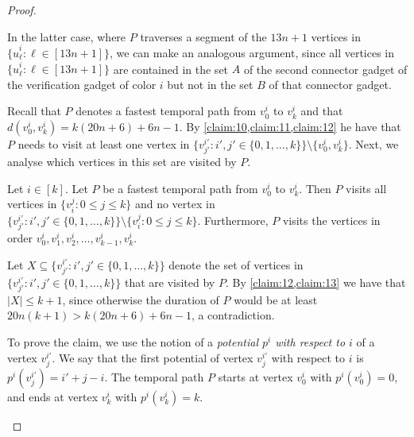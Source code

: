 \documentclass[a4paper,UKenglish,cleveref, autoref, thm-restate, anonymous]{lipics-v2021}
\begin{document}
\begin{proof}
\begin{claimproof}
    In the latter case, where $P$ traverses a segment of the $13n+1$ vertices in $\{\hat{u}^i_\ell :  \ell\in[13n+1]\}$, we can make an analogous argument, since all vertices in $\{\hat{u}^i_\ell :  \ell\in[13n+1]\}$ are contained in the set $A$ of the second connector gadget of the verification gadget of color $i$ but not in the set $B$ of that connector gadget.
\end{claimproof}

Recall that $P$ denotes a fastest temporal path from $v_0^i$ to $v_k^i$ and that $d(v_0^i,v_k^i)=k(20n+6)+6n-1$. By \cref{claim:10,claim:11,claim:12} he have that $P$ needs to visit at least one vertex in $\{v^{i'}_{j'} :  i',j'\in \{0,1,\ldots,k\}\}\setminus\{v^i_0,v^i_k\}$. Next, we analyse which vertices in this set are visited by $P$.

\begin{claim}\label{claim:14}
Let $i\in[k]$. Let $P$ be a fastest temporal path from $v_0^i$ to $v_k^i$. Then $P$ visits all vertices in $\{v^j_i :  0\le j\le k\}$ and no vertex in $\{v^{i'}_{j'} :  i',j'\in \{0,1,\ldots,k\}\}\setminus\{v^j_i :  0\le j\le k\}$.
Furthermore, $P$ visits the vertices in order $v^i_0, v^i_1, v^i_2, \ldots, v^i_{k-1},v^i_k$.
\end{claim}
\begin{claimproof}
Let $X\subseteq \{v^{i'}_{j'} :  i',j'\in \{0,1,\ldots,k\}\}$ denote the set of vertices in $\{v^{i'}_{j'} :  i',j'\in \{0,1,\ldots,k\}\}$ that are visited by $P$.
By \cref{claim:12,claim:13} we have that $|X|\le k+1$, since otherwise the duration of $P$ would be at least $20n(k+1)>k(20n+6)+6n-1$, a contradiction.

    To prove the claim, we use the notion of a \emph{potential $p^i$ with respect to $i$} of a vertex $v^{i'}_j$.
    We say that the first potential of vertex $v^{i'}_j$ with respect to $i$ is $p^i(v^{i'}_j)=i'+j-i$.
    The temporal path $P$ starts at vertex $v^i_0$ with $p^i(v^i_0)=0$, and ends at vertex $v^i_k$ with $p^i(v^i_k)=k$. 


\end{claimproof}
\end{proof}
\end{document}
